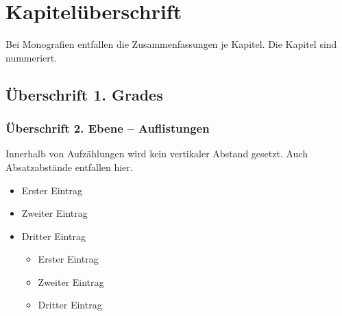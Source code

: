 
\chapter{Kapitelüberschrift}

Bei Monografien entfallen die Zusammenfassungen je Kapitel. Die Kapitel sind nummeriert.

\section{Überschrift 1. Grades}

\blindtext

\subsection{Überschrift 2. Ebene – Auflistungen}

Innerhalb von Aufzählungen wird kein vertikaler Abstand gesetzt. Auch Absatzabstände entfallen hier.

\begin{itemize}
	\item Erster Eintrag
	\item Zweiter Eintrag
	\item Dritter Eintrag
	\begin{itemize}
		\item Erster Eintrag
		\item Zweiter Eintrag
		\item Dritter Eintrag
	\end{itemize}
\end{itemize}

